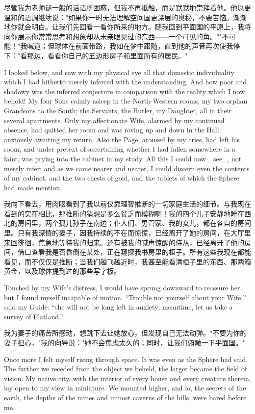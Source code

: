 \documentclass[12pt,UTF8]{ctexbook}
\begin{document}
尽管我为老师谜一般的话语所困惑，但我不再抵触，而是默默地崇拜着他。他以更温和的语调继续说："如果你一时无法理解空间国更深层的奥秘，不要苦恼。渐渐地你就会明白。让我们先回看一看你所来的地方。随我回到平面国的平原上，我将向你展示你常常思考和想象却从未亲眼见过的东西——一个可见的角。""不可能！"我喊道；但球体在前面带路，我如在梦中跟随，直到他的声音再次使我停下："看那边，看看你自己的五边形房子和里面所有的居民。"

I looked below, and saw with my physical eye all that domestic individuality which I had hitherto merely inferred with the understanding. And how poor and shadowy was the inferred conjecture in comparison with the reality which I now behold! My four Sons calmly asleep in the North-Western rooms, my two orphan Grandsons to the South; the Servants, the Butler, my Daughter, all in their several apartments. Only my affectionate Wife, alarmed by my continued absence, had quitted her room and was roving up and down in the Hall, anxiously awaiting my return. Also the Page, aroused by my cries, had left his room, and under pretext of ascertaining whether I had fallen somewhere in a faint, was prying into the cabinet in my study. All this I could now \_see\_, not merely infer; and as we came nearer and nearer, I could discern even the contents of my cabinet, and the two chests of gold, and the tablets of which the Sphere had made mention.

我向下看去，用肉眼看到了我以前仅靠理智推断的一切家庭生活的细节。与我现在看到的实在相比，那推断的猜想是多么贫乏而模糊啊！我的四个儿子安静地睡在西北的房间里，两个孤儿孙子在南边；仆人们、男管家、我的女儿，都在各自的房间里。只有我深情的妻子，因我持续的不在而惊慌，已经离开了她的房间，在大厅里来回徘徊，焦急地等待我的归来。还有被我的喊声惊醒的侍从，已经离开了他的房间，借口查看我是否昏倒在某处，正在窥探我书房里的柜子。所有这些我现在都能看见，而不仅仅是推断；当我们越飞越近时，我甚至能看清柜子里的东西、那两箱黄金，以及球体提到过的那些写字板。

Touched by my Wife's distress, I would have sprung downward to reassure her, but I found myself incapable of motion. ``Trouble not yourself about your Wife,'' said my Guide: ``she will not be long left in anxiety; meantime, let us take a survey of Flatland.''

我为妻子的痛苦所感动，想跳下去让她放心，但发现自己无法动弹。"不要为你的妻子担心，"我的向导说："她不会焦虑太久的；同时，让我们俯瞰一下平面国。"

Once more I felt myself rising through space. It was even as the Sphere had said. The further we receded from the object we beheld, the larger became the field of vision. My native city, with the interior of every house and every creature therein, lay open to my view in miniature. We mounted higher, and lo, the secrets of the earth, the depths of the mines and inmost caverns of the hills, were bared before me.
\end{document}
